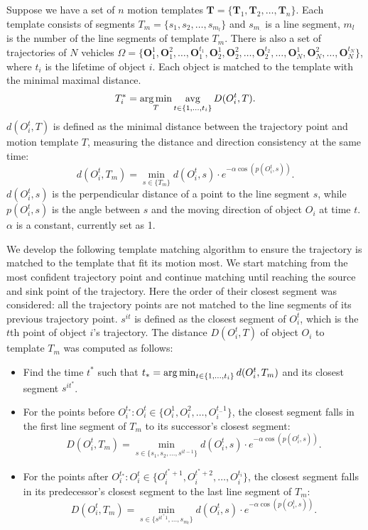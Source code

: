 Suppose we have a set of $n$ motion templates $\mathbf{T} = \{\mathbf{T}_1, \mathbf{T}_2, \dots, \mathbf{T}_n\}$. 
Each template consists of segments $T_{m} = \{s_{1}, s_{2}, \dots, s_{m_l}\}$ and $s_{m_\cdot}$ is a line segment, $m_{l}$ is the number of the line segments of template $T_m$.
There is also a set of trajectories of $N$ vehicles $\Omega= \{\mathbf{O}_1^1, \mathbf{O}_1^2, \dots, \mathbf{O}_1^{t_1}, \mathbf{O}_2^1, \mathbf{O}_2^2, \dots, \mathbf{O}_2^{t_2}, \dots, \mathbf{O}_N^1, \mathbf{O}_N^2, \dots, \mathbf{O}_N^{t_N}\}$, where $t_i$ is the lifetime of object $i$.
Each object is matched to the template with the minimal maximal distance.
\begin{align}
T_i^* = \operatorname*{arg\,min}_{T}{\operatorname*{avg}_{t\in\{1, \dots, t_i\}}{D(O_i^t, T)}}.
\end{align}
$d(O_i^t, T)$ is defined as the minimal distance between the trajectory point and motion template $T$, measuring the distance and direction consistency at the same time:
$$d(O_i^t, T_m) = \min_{s\in\{T_m\}}{d(O_i^t, s)\cdot e^{-\alpha\cos(p(O_i^t, s))}}.$$
$d(O_i^t, s)$ is the perpendicular distance of a point to the line segment $s$, 
while $p(O_i^t, s)$ is the angle between $s$ and the moving direction of object $O_i$ at time $t$.
$\alpha$ is a constant, currently set as 1.

We develop the following template matching algorithm to ensure the trajectory is matched to the template that fit its motion most.
We start matching from the most confident trajectory point and continue matching until reaching the source and sink point of the trajectory.
Here the order of their closest segment was considered: all the trajectory points are not matched to the line segments of its previous trajectory point.
$s^{it}$ is defined as the closest segment of $O_i^t$, which is the $t$th point of object $i$'s trajectory. 
The distance $D(O_i^t, T)$ of object $O_i$ to template $T_m$ was computed as follows:
\begin{itemize}
\item Find the time $t^*$ such that $t_* = \operatorname*{arg\,min}_{t\in\{1, \dots, t_i\}}{d(O_i^t, T_m)}$ and its closest segment $s^{it^*}$.
\item For the points before $O_i^{t_*}: O_i^{t}\in\{O_i^{1}, O_i^{2}, \dots, O_i^{t_-1}\}$, the closest segment falls in the first line segment of $T_m$ to its successor’s closest segment:
 $$D(O_i^t, T_m) = \min_{s\in\{s_1, s_2, \dots, s^{it-1}\}}{d(O_i^t, s)\cdot e^{-\alpha\cos(p(O_i^t, s))}}.$$
\item For the points after $O_i^{t_*}: O_i^{t}\in\{O_i^{t^*+1}, O_i^{t^*+2}, \dots, O_i^{t_i}\}$, the closest segment falls in its predecessor’s closest segment to the last line segment of $T_m$:
 $$D(O_i^t, T_m) = \min_{s\in\{s^{it^+1}, \dots, s_{m_l}\}}{d(O_i^t, s)\cdot e^{-\alpha\cos(p(O_i^t, s))}}.$$
\end{itemize}

